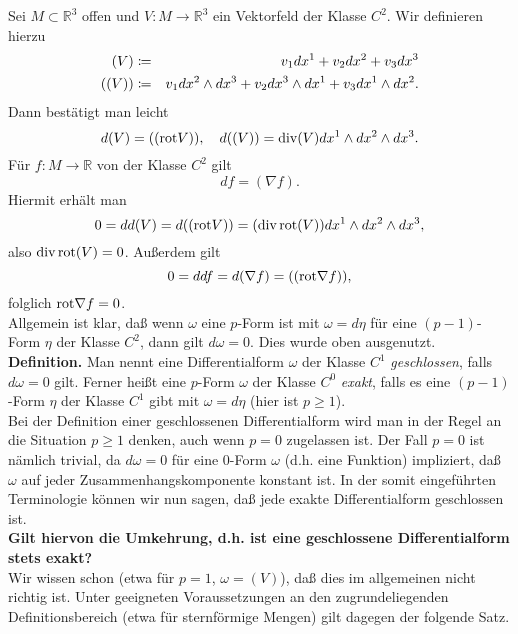\documentclass[a4paper,twoside,DIV15,BCOR12mm]{scrbook}
\begin{document}
\bigskip

 Sei $M \subset {\mathbb R}^{3}$ offen und 
$V: M \to {\mathbb R}^{3}$ ein Vektorfeld der Klasse $C^{2}$. Wir 
definieren hierzu
\begin{eqnarray*}
(V) & \da  & v_{1} dx^{1} + v_{2} dx^{2} + v_{3}dx^{3} \\
((V)) & \da  & v_{1} dx^{2} \wedge dx^{3} + v_{2} dx^{3} \wedge 
dx^{1} + v_{3}dx^{1} \wedge dx^{2}.
\end{eqnarray*}
Dann bestätigt man leicht
\[ d(V) = (({\rm rot} V)), \quad d((V)) = {\rm div}(V)  dx^{1} 
\wedge dx^{2} \wedge dx^{3}. \]
Für $f: M \to {\mathbb R}$ von der Klasse $C^{2}$ gilt
\[ df = (\nabla f). \]
Hiermit erhält man
\[ 0 = dd(V) = d(({\rm rot} V)) = ({\rm div\, rot} (V)) dx^{1} 
\wedge dx^{2} \wedge dx^{3}, \]
also ${\rm div\, rot} (V) = 0$. Außerdem gilt
\[ 0 = ddf = d(\nabla f) = (({\rm rot} \nabla  
f)), \]
folglich ${\rm rot} \nabla f = 0$.\\

\noindent
Allgemein ist klar, daß wenn $\omega$ eine $p$-Form ist mit 
$\omega = d\eta$ für eine $(p-1)$-Form $\eta$ der Klasse $C^{2}$, 
dann gilt $d\omega = 0$. Dies wurde oben ausgenutzt.\\

\noindent
{\bf Definition.}  Man nennt eine 
Differentialform $\omega$ der Klasse $C^{1}$ 
{\em geschlossen}, falls 
$d \omega = 0$ gilt. Ferner heißt eine $p$-Form $\omega$ der 
Klasse $C^{0}$ {\em exakt}, 
falls es eine $(p-1)$-Form $\eta$ der Klasse 
$C^{1}$ gibt mit $\omega = d\eta$ (hier ist $p\ge 1$).\\


\noindent Bei der Definition einer geschlossenen Differentialform wird man in der Regel
an die Situation  $p \ge 1$ denken, auch wenn $p=0$ zugelassen ist. Der Fall $p = 
0$ ist nämlich trivial, da $d\omega = 0$ für eine 0-Form $\omega$ 
(d.h. eine Funktion) impliziert, daß $\omega$  auf jeder Zusammenhangskomponente konstant ist. In 
der somit eingeführten Terminologie können wir nun sagen, daß jede exakte 
Differentialform geschlossen ist.\\

\noindent
{\bf 
Gilt hiervon die Umkehrung, d.h. ist eine geschlossene 
Differentialform stets exakt?}\\

\noindent
Wir wissen schon (etwa für $p = 1$, $\omega = (V)$), daß dies im 
allgemeinen nicht richtig ist. Unter geeigneten Voraussetzungen an den 
zugrundeliegenden Definitionsbereich (etwa für sternförmige Mengen) 
gilt dagegen der folgende Satz.\\
\end{document}
